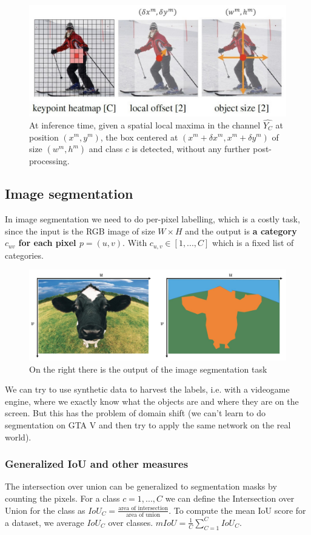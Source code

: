 \begin{figure}[htbp]
  \centering
  \includegraphics[width=0.9\linewidth]{./img/centernet.jpg}
  \caption{At inference time, given a spatial local maxima in the channel $\hat{Y_C}$ at position $(x^m, y^m)$, the box centered at $(x^m + \delta x^m, x^m + \delta y^m)$ of size $(w^m, h^m)$ and class $c$ is detected, without any further post-processing.}
\end{figure}


\subsection{Image segmentation}
In image segmentation we need to do per-pixel labelling, which is a costly task, since the input is the RGB image of size $W\times H$ and the output is \textbf{a category $c_{uv}$ for each pixel $p=(u,v)$}.
With $c_{u,v} \in [1,... ,C]$ which is a fixed list of categories.

\begin{figure}[htbp]
  \centering
  \includegraphics[width=0.7\linewidth]{./img/segmentation_task.jpg}
  \caption{On the right there is the output of the image segmentation task}
\end{figure}

We can try to use synthetic data to harvest the labels, i.e. with a videogame engine, where we exactly know what the objects are and where they are on the screen.
But this has the problem of domain shift (we can't learn to do segmentation on GTA V and then try to apply the same network on the real world).

\subsubsection{Generalized IoU and other measures}
The intersection over union can be generalized to segmentation masks by counting the pixels.
For a class $c = 1, ..., C$ we can define the Intersection over Union for the class as $IoU_C = \frac{\text{area of intersection}}{\text{area of union}}$.
To compute the mean IoU score for a dataset, we average $IoU_C$ over classes.
$mIoU = \frac{1}{C} \sum_{C=1}^{C} IoU_C$.


